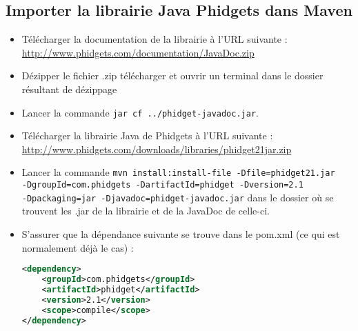 \subsection{Importer la librairie Java Phidgets dans Maven}
\begin{itemize}
\item Télécharger la documentation de la librairie à l’URL suivante :\\\url{http://www.phidgets.com/documentation/JavaDoc.zip}
\item Dézipper le fichier .zip télécharger et ouvrir un terminal dans le dossier résultant de dézippage
\item Lancer la commande \texttt{jar cf ../phidget-javadoc.jar}.
\item Télécharger la librairie Java de Phidgets à l’URL suivante : \url{http://www.phidgets.com/downloads/libraries/phidget21jar.zip}
\item Lancer la commande \texttt{mvn install:install-file -Dfile=phidget21.jar\\-DgroupId=com.phidgets -DartifactId=phidget -Dversion=2.1\\-Dpackaging=jar -Djavadoc=phidget-javadoc.jar} dans le dossier où se trouvent les .jar de la librairie et de la JavaDoc de celle-ci.
\item S'assurer que la dépendance suivante se trouve dans le pom.xml (ce qui est normalement déjà le cas) :
\begin{lstlisting}[language=XML, numbers=none]
<dependency>
    <groupId>com.phidgets</groupId>
    <artifactId>phidget</artifactId>
    <version>2.1</version>
    <scope>compile</scope>
</dependency>
\end{lstlisting}
\end{itemize}